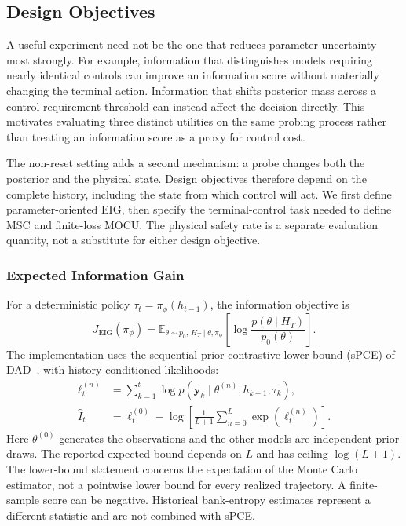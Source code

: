 \documentclass[journal]{IEEEtran}
\newcommand{\E}{\mathbb E}
\begin{document}
\subsection{Design Objectives}
\label{sec:objectives}
A useful experiment need not be the one that reduces parameter uncertainty
most strongly. For example, information that distinguishes models requiring
nearly identical controls can improve an information score without materially
changing the terminal action. Information that shifts posterior mass across
a control-requirement threshold can instead affect the decision directly.
This motivates evaluating three distinct utilities on the same probing
process rather than treating an information score as a proxy for control cost.

The non-reset setting adds a second mechanism: a probe changes both the
posterior and the physical state. Design objectives therefore depend on the
complete history, including the state from which control will act. We first
define parameter-oriented EIG, then specify the terminal-control task needed
to define MSC and finite-loss MOCU. The physical safety rate is a separate
evaluation quantity, not a substitute for either design objective.

\subsubsection{Expected Information Gain}
For a deterministic policy $\tau_t=\pi_\phi(h_{t-1})$, the information objective is
\begin{equation}
J_{\mathrm{EIG}}(\pi_\phi)=
\E_{\theta\sim p_0,\,H_T\mid\theta,\pi_\phi}
\left[\log\frac{p(\theta\mid H_T)}{p_0(\theta)}\right].
\label{eq:eig}
\end{equation}
The implementation uses the sequential prior-contrastive lower bound
(sPCE) of DAD~\cite{foster2021dad}, with history-conditioned likelihoods:
\begin{align}
\ell_t^{(n)}&=\sum_{k=1}^t
\log p(\mathbf y_k\mid\theta^{(n)},h_{k-1},\tau_k),\\
\widehat I_t&=\ell_t^{(0)}-
\log\left[\frac{1}{L+1}\sum_{n=0}^{L}\exp(\ell_t^{(n)})\right].
\label{eq:spce}
\end{align}
Here $\theta^{(0)}$ generates the observations and the other models are
independent prior draws. The reported expected bound depends on $L$ and
has ceiling $\log(L+1)$. The lower-bound statement concerns the expectation
of the Monte Carlo estimator, not a pointwise lower bound for every realized
trajectory. A finite-sample score can be negative. Historical bank-entropy
estimates represent a different statistic and are not combined with sPCE.
\end{document}
